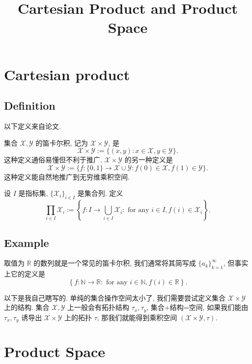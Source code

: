 \documentclass[a4paper,11pt]{article}
\title{Cartesian Product and Product Space}
\theoremstyle{definition}
\begin{document}
\maketitle



\section{Cartesian product}

\subsection{Definition}

以下定义来自论文\cite[p.113]{m75}.

集合 $ \mathcal{X}, \mathcal{Y} $ 的笛卡尔积, 记为 $ \mathcal{X} \times \mathcal{Y} $, 是
$$ 
    \mathcal{X} \times \mathcal{Y}
        := \{(x, y) : x \in \mathcal{X}, y \in \mathcal{Y} \}.
$$
这种定义通俗易懂但不利于推广. 
$ \mathcal{X} \times \mathcal{Y} $ 的另一种定义是
$$
    \mathcal{X} \times \mathcal{Y}
        := \{ f: \{0, 1\} \to \mathcal{X} \cup \mathcal{Y} : f(0) \in \mathcal{X}, f(1) \in \mathcal{Y} \}.
$$
这种定义能自然地推广到无穷维乘积空间.

设 $ I $ 是指标集, $ \{\mathcal{X}_i\}_{i \in I} $ 是集合列.
定义
$$
    \prod_{i \in I} \mathcal{X}_i
        := \left\{ f: I \to \bigcup_{i \in I} \mathcal{X}_i 
            : \text{ for any } i \in I, f(i) \in \mathcal{X}_i \right\}.
$$

\subsection{Example}

取值为 $ \mathbb{R} $ 的数列就是一个常见的笛卡尔积, 我们通常将其简写成 $ \{a_k\}_{k = 1}^\infty $,
但事实上它的定义是
$$
    \left\{ f: \mathbb{N} \to \mathbb{R}
        : \text{ for any } i \in \mathbb{N}, f(i) \in \mathbb{R} \right\}.
$$

以下是我自己瞎写的.
单纯的集合操作空间太小了, 我们需要尝试定义集合 $ \mathcal{X} \times \mathcal{Y} $ 上的结构.
集合 $ \mathcal{X}, \mathcal{Y} $ 上一般会有拓扑结构 $ \tau_x, \tau_y $, 集合+结构=空间,
如果我们能由 $ \tau_x, \tau_y $ 诱导出 $ \mathcal{X} \times \mathcal{Y} $ 上的拓扑 $ \tau $,
那我们就能得到乘积空间 $ (\mathcal{X} \times \mathcal{Y}, \tau) $.

\section{Product Space}
\end{document}
